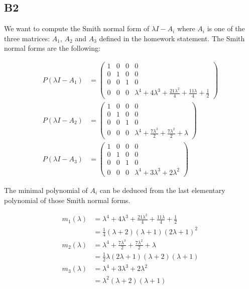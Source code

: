 \documentclass[11pt]{article}
\begin{document}
\subsection*{B2}
We want to compute the Smith normal form of $\lambda I - A_{i}$ where $A_{i}$ is one of the three matrices: $A_1$, $A_2$ and $A_3$ defined in the homework statement. The Smith normal forms are the following:

\begin{align*} P(\lambda I - A_{1}) &=
    \begin{pmatrix}
    1 & 0 & 0 & 0 \\
    0 & 1 & 0 & 0 \\
    0 & 0 & 1 & 0 \\
    0 & 0 & 0 & \lambda^{4} + 4 \lambda^{3} + \frac{21 \lambda^{2}}{4} + \frac{11 \lambda}{4} + \frac{1}{2}
    \end{pmatrix} \\
    P(\lambda I - A_{2}) &=
    \begin{pmatrix}
    1 & 0 & 0 & 0 \\
    0 & 1 & 0 & 0 \\
    0 & 0 & 1 & 0 \\
    0 & 0 & 0 & \lambda^{4} + \frac{7 \lambda^{3}}{2} + \frac{7 \lambda^{2}}{2} + \lambda
    \end{pmatrix} \\
    P(\lambda I - A_{3}) &=
    \begin{pmatrix}
    1 & 0 & 0 & 0 \\
    0 & 1 & 0 & 0 \\
    0 & 0 & 1 & 0 \\
    0 & 0 & 0 & \lambda^{4} + 3 \lambda^{3} + 2 \lambda^{2}
    \end{pmatrix}
\end{align*}

The minimal polynomial of $A_{i}$ can be deduced from the last elementary polynomial of those Smith normal forms.

\begin{align*}
    m_{1}(\lambda) &= \lambda^{4} + 4 \lambda^{3} + \frac{21 \lambda^{2}}{4} + \frac{11 \lambda}{4} + \frac{1}{2} \\
    &= \frac{1}{4} (\lambda + 2) (\lambda + 1) (2 \lambda + 1)^{2} \\
    m_{2}(\lambda) &= \lambda^{4} + \frac{7 \lambda^{3}}{2} + \frac{7 \lambda^{2}}{2} + \lambda \\
    &= \frac{1}{2} \lambda (2 \lambda + 1) (\lambda + 2) (\lambda + 1) \\
    m_{3}(\lambda) &= \lambda^{4} + 3 \lambda^{3} + 2 \lambda^{2} \\
    &= \lambda^{2} (\lambda + 2) (\lambda + 1)
\end{align*}
\end{document}
